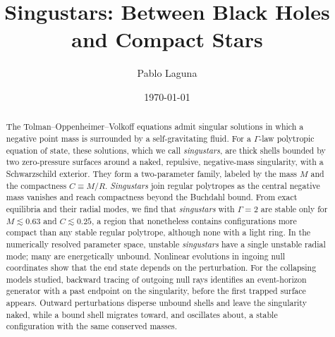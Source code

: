\documentclass[%
 reprint,
 amsmath,amssymb,
 aps,prd,
 superscriptaddress,
]{revtex4-2}
\begin{document}
\def\tov#1{Tolman--Oppenheimer--Volkoff#1 (TOV#1)\gdef\tov{TOV}}
\def\eos#1{equation of state#1 (EOS#1)\gdef\eos{EOS}}
\def\bh#1{black hole#1 (BH#1)\gdef\bh{BH}}
\def\singu#1{\emph{singustar#1}}
\newcommand{\PL}[1]{{\textcolor{red}{\sf{[PL: #1]}}}}


\title{Singustars: Between Black Holes and Compact Stars}

\author{Pablo Laguna}

\date{\today}

\begin{abstract}
The Tolman--Oppenheimer--Volkoff equations admit singular solutions in which a negative point mass is surrounded by a self-gravitating fluid. For a $\Gamma$-law polytropic equation of state, these solutions, which we call \emph{singustars}, are thick shells bounded by two zero-pressure surfaces around a naked, repulsive, negative-mass singularity, with a Schwarzschild exterior. They form a two-parameter family, labeled by the mass $M$ and the compactness $C\equiv M/R$. \emph{Singustars} join regular polytropes as the central negative mass vanishes and reach compactness beyond the Buchdahl bound. From exact equilibria and their radial modes, we find that \emph{singustars} with $\Gamma = 2$ are stable only for $M\lesssim0.63$ and $C\lesssim0.25$, a region that nonetheless contains configurations more compact than any stable regular polytrope, although none with a light ring. In the numerically resolved parameter space, unstable \emph{singustars} have a single unstable radial mode; many are energetically unbound. Nonlinear evolutions in ingoing null coordinates show that the end state depends on the perturbation. For the collapsing models studied, backward tracing of outgoing null rays identifies an event-horizon generator with a past endpoint on the singularity, before the first trapped surface appears. Outward perturbations disperse unbound shells and leave the singularity naked, while a bound shell migrates toward, and oscillates about, a stable configuration with the same conserved masses.
\end{abstract}

\maketitle
\end{document}
